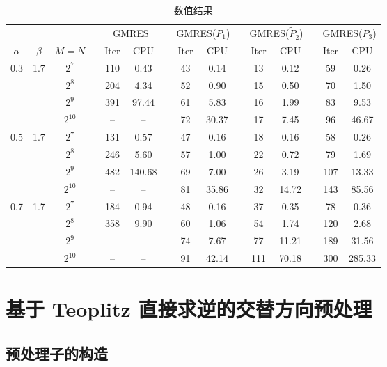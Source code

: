 \documentclass{ecnumaster}
\begin{document}
\begin{table}[H]
\centering
\caption{数值结果} \label{tab4-3-3}\smallskip
\begin{tabular}{ccccccccccccccc} \toprule
& &  && \multicolumn{2}{c}{GMRES} && \multicolumn{2}{c}{GMRES($P_1$)}
&& \multicolumn{2}{c}{GMRES($\tilde{P}_2$)}
&& \multicolumn{2}{c}{GMRES($P_3$)} \\
$\alpha$ & $\beta$ & $M = N$ && Iter & CPU && Iter & CPU
&& Iter & CPU && Iter & CPU \\ \midrule
0.3 & 1.7
 & $2^7$    && 110 & 0.43   && 43 &0.14   && 13 & 0.12  && 59 & 0.26    \\
&& $2^8$    && 204 & 4.34   && 52 &0.90   && 15 & 0.50  && 70 & 1.50    \\
&& $2^9$    && 391 & 97.44  && 61 &5.83   && 16 & 1.99  && 83 & 9.53    \\
&& $2^{10}$ && --  & --     && 72 &30.37  && 17 & 7.45  && 96 & 46.67   \\ \midrule
0.5 & 1.7
 & $2^7$    && 131 & 0.57   && 47 &0.16   && 18 & 0.16  && 58 & 0.26    \\
&& $2^8$    && 246 & 5.60   && 57 &1.00   && 22 & 0.72  && 79 & 1.69     \\
&& $2^9$    && 482 & 140.68 && 69 &7.00   && 26 & 3.19  && 107 & 13.33   \\
&& $2^{10}$ && --  & --     && 81 &35.86  && 32 & 14.72 && 143 & 85.56   \\ \midrule
0.7 & 1.7
 & $2^7$    && 184 & 0.94   && 48 &0.16   && 37 & 0.35  && 78 & 0.36     \\
&& $2^8$    && 358 & 9.90   && 60 &1.06   && 54 & 1.74  && 120 & 2.68    \\
&& $2^9$    && --  & --     && 74 &7.67   && 77 & 11.21 && 189 & 31.56   \\
&& $2^{10}$ && --  & --     && 91 &42.14  && 111 & 70.18&& 300 & 285.33  \\ \bottomrule
\end{tabular}
\end{table}




\section{基于 Teoplitz 直接求逆的交替方向预处理}
\subsection{预处理子的构造}
\end{document}
